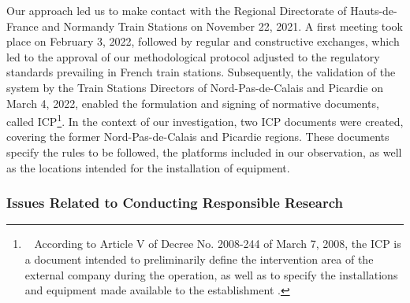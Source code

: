 \begin{refsegment}
Our approach led us to make contact with the Regional Directorate of Hauts-de-France and Normandy Train Stations on November 22, 2021. A first meeting took place on February 3, 2022, followed by regular and constructive exchanges, which led to the approval of our methodological protocol adjusted to the regulatory standards prevailing in French train stations. Subsequently, the validation of the system by the Train Stations Directors of Nord-Pas-de-Calais and Picardie on March 4, 2022, enabled the formulation and signing of normative documents, called \acrfull{ICP}\footnote{~
According to Article V of Decree No. 2008-244 of March 7, 2008, the \acrshort{ICP} is a document intended to preliminarily define the intervention area of the external company during the operation, as well as to specify the installations and equipment made available to the establishment \textcolor{blue}{\autocite{legifrance_section_2008}}.
}. In the context of our investigation, two \acrshort{ICP} documents were created, covering the former Nord-Pas-de-Calais and Picardie regions. These documents specify the rules to be followed, the platforms included in our observation, as well as the locations intended for the installation of equipment.%

\subsubsection*{Issues Related to Conducting Responsible Research
    \label{chap3:rgpd}
    }


\end{refsegment}
